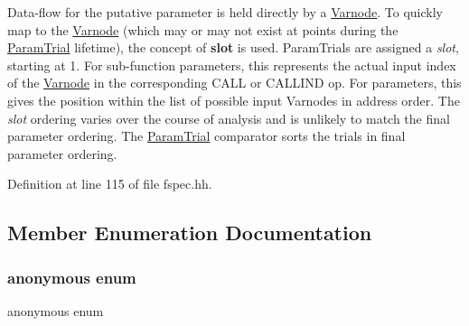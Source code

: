 Data-\/flow for the putative parameter is held directly by a \mbox{\hyperlink{class_varnode}{Varnode}}. To quickly map to the \mbox{\hyperlink{class_varnode}{Varnode}} (which may or may not exist at points during the \mbox{\hyperlink{class_param_trial}{Param\+Trial}} lifetime), the concept of {\bfseries{slot}} is used. Param\+Trials are assigned a {\itshape slot}, starting at 1. For sub-\/function parameters, this represents the actual input index of the \mbox{\hyperlink{class_varnode}{Varnode}} in the corresponding C\+A\+LL or C\+A\+L\+L\+I\+ND op. For parameters, this gives the position within the list of possible input Varnodes in address order. The {\itshape slot} ordering varies over the course of analysis and is unlikely to match the final parameter ordering. The \mbox{\hyperlink{class_param_trial}{Param\+Trial}} comparator sorts the trials in final parameter ordering. 

Definition at line 115 of file fspec.\+hh.



\subsection{Member Enumeration Documentation}
\mbox{\label{class_param_trial_a716f03faac64ddccab096ba19364ffa2}} 
\subsubsection{\texorpdfstring{anonymous enum}{anonymous enum}}
{\footnotesize\ttfamily anonymous enum}

